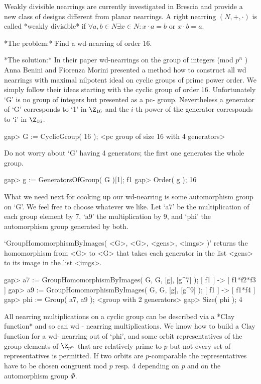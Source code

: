 %
%

Weakly divisible nearrings are currently investigated in Brescia and provide
a new class of designs different from planar nearrings.
A right nearring $(N,+,\cdot)$ is called *weakly divisible* if 
$\forall a,b\in N \exists x\in N : x\cdot a=b$ or $x\cdot b=a$.



*The problem:* Find a wd-nearring of order 16.

*The solution:* In their paper wd-nearrings on the group of integers (mod 
$p^n$ ) Anna Benini and Fiorenza Morini presented a method how to construct
all wd nearrings with maximal nilpotent ideal on cyclic groups of prime 
power order. We simply follow their ideas starting with the cyclic group of 
order 16. Unfortunately `G' is no group of integers but presented as a pc-
group. Nevertheless a generator of `G' corresponds to `1' in $\Z_{16}$ and
the $i$-th power of the generator corresponds to `i' in $\Z_{16}$.

\beginexample
    gap> G := CyclicGroup( 16 );
    <pc group of size 16 with 4 generators> 
\endexample

Do not worry about `G' having 4 generators; the first one generates the 
whole group.

\beginexample 
    gap> g := GeneratorsOfGroup( G )[1];
    f1
    gap> Order( g );
    16
\endexample

What we need next for cooking up our wd-nearring is some automorphism group
on `G'. We feel free to choose whatever we like. Let `a7' be the 
multiplication of each group element by 7, `a9' the multiplication by 9, 
and `phi' the automorphism group generated by both.

`GroupHomomorphismByImages( <G>, <G>, <gens>, <imgs> )' returns the 
homomorphism from <G> to <G> that takes each generator in the list <gens> 
to its image in the list <imgs>.

\beginexample
    gap> a7 := GroupHomomorphismByImages( G, G, [g], [g^7] );
    [ f1 ] -> [ f1*f2*f3 ]
    gap> a9 := GroupHomomorphismByImages( G, G, [g], [g^9] ); 
    [ f1 ] -> [ f1*f4 ]
    gap> phi := Group( a7, a9 );
    <group with 2 generators>
    gap> Size( phi );
    4
\endexample

All nearring multiplications on a cyclic group can be described via a *Clay
function* and so can wd - nearring multiplications. We know how to build a
Clay function for a wd- nearring out of `phi', and some orbit representatives  
of the group elements of $\Z_{p^n}$ that are relatively prime to $p$ but not
every set of representatives is permitted. If two orbits are $p$-comparable
the representatives have to be chosen congruent mod $p$ resp. $4$ 
depending on $p$ and on the automorphism group $\Phi$.

